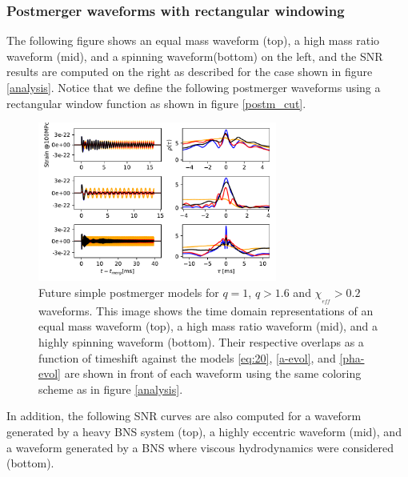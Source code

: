 \subsubsection*{Postmerger waveforms with rectangular windowing}


The following figure shows an equal mass waveform (top), a high mass ratio waveform (mid), and a spinning waveform(bottom) on the left, and the SNR results are computed on the right as described for the case shown in figure \ref{analysis}. Notice that we define the following postmerger waveforms using a rectangular window function as shown in figure \ref{postm_cut}.


\begin{figure}[hbt!]
\begin{center}
\includegraphics[width=0.7\textwidth, angle=0]{images/Data_analysis/results/phi-A1.pdf}
\captionsetup{width=0.8\textwidth}
\caption[Future simple postmerger models for $q=1$, $q>1.6$ and $\chi_{_{eff}}>0.2$ waveforms]{Future simple postmerger models for $q=1$, $q>1.6$ and $\chi_{_{eff}}>0.2$ waveforms. This image shows the time domain representations of an equal mass waveform (top), a high mass ratio waveform (mid), and a highly spinning waveform (bottom). Their respective overlaps as a function of timeshift against the models \ref{eq:20}, \ref{a-evol}, and \ref{pha-evol} are shown in front of each waveform using the same coloring scheme as in figure \ref{analysis}.}
\label{ncfrnv}
\end{center}
\end{figure}
\FloatBarrier

In addition, the following SNR curves are also computed for a waveform generated by a heavy BNS system (top), a highly eccentric waveform (mid), and a waveform generated by a BNS where viscous hydrodynamics were considered (bottom).

